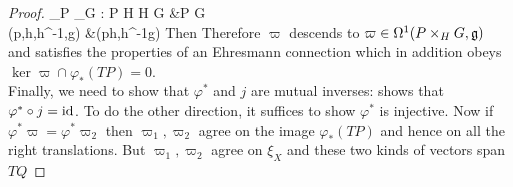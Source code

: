 \documentclass{article}
\begin{document}
\begin{proof}
{\mu_P \times \mu_G : P \times H \times H \times G &\to P \times G \\
(p,h,h^{-1},g) &\mapsto (ph,h^{-1}g)
}
Then 
Therefore $\varpi$ descends to $\varpi \in \Omega^1(P\times_H G,\mathfrak{g})$ and satisfies the properties of an Ehresmann connection which in addition obeys $\ker \varpi \cap \varphi_\ast(TP)=0 $. \\
Finally, we need to show that $\varphi^\ast$ and $j$ are mutual inverses:
shows that $\varphi^\ast \circ j = \operatorname{id}$. To do the other direction, it suffices to show $\varphi^\ast$ is injective. Now if $\varphi^\ast \varpi = \varphi^\ast \varpi_2$ then $\varpi_1,\varpi_2$ agree on the image $\varphi_\ast(TP)$ and hence on all the right translations. But $\varpi_1, \varpi_2$ agree on $\xi_X$ and these two kinds of vectors span $TQ$
\end{proof}





\end{document}
